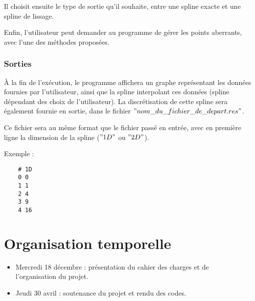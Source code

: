 \documentclass[a4paper,12pt]{article}
\begin{document}
Il choisit ensuite le type de sortie qu'il souhaite, entre une spline exacte et une spline de lissage.

Enfin, l'utilisateur peut demander au programme de gérer les points aberrants, avec l'une des méthodes proposées.

\newpage
\subsubsection{Sorties}

À la fin de l'exécution, le programme affichera un graphe représentant les données fournies par l'utilisateur, ainsi que la spline interpolant ces données (spline dépendant des choix de l'utilisateur). La discrétisation de cette spline sera également fournie en sortie, dans le fichier $"nom\_du\_fichier\_de\_depart.res"$.

Ce fichier sera au même format que le fichier passé en entrée, avec en première ligne la dimension de la spline ($"1D" $ ou $"2D"$).

Exemple : 

\begin{lstlisting}
    # 1D
    0 0
    1 1
    2 4
    3 9
    4 16
\end{lstlisting}

\section{Organisation temporelle}
\begin{itemize}
\item Mercredi 18 décembre : présentation du cahier des charges et de l'organisation du projet.
\item Jeudi 30 avril : soutenance du projet et rendu des codes.
\end{itemize}
\end{document}
